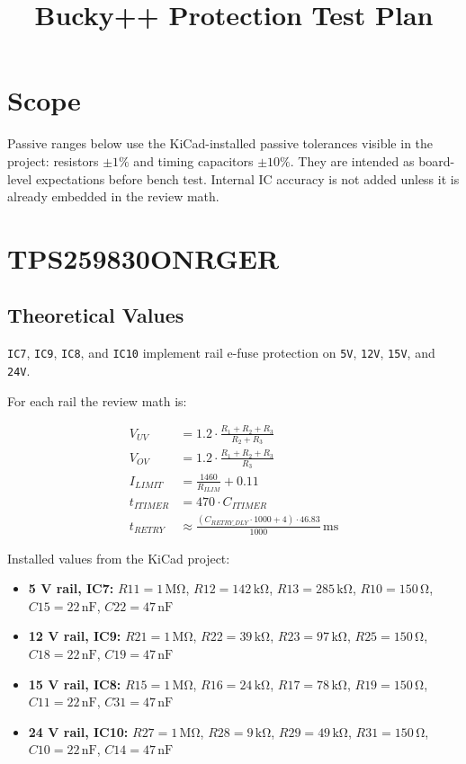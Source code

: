 \documentclass[11pt,a4paper]{article}
\begin{document}
\title{Bucky++ Protection Test Plan}
\date{}
\maketitle
\tableofcontents

\section*{Scope}

Passive ranges below use the KiCad-installed passive tolerances visible in the project: resistors $\pm 1\%$ and timing capacitors $\pm 10\%$. They are intended as board-level expectations before bench test. Internal IC accuracy is not added unless it is already embedded in the review math.

\section{TPS259830ONRGER}

\subsection{Theoretical Values}

\texttt{IC7}, \texttt{IC9}, \texttt{IC8}, and \texttt{IC10} implement rail e-fuse protection on \texttt{5V}, \texttt{12V}, \texttt{15V}, and \texttt{24V}.

For each rail the review math is:

\begin{align}
V_{UV} &= 1.2 \cdot \frac{R_1 + R_2 + R_3}{R_2 + R_3} \\
V_{OV} &= 1.2 \cdot \frac{R_1 + R_2 + R_3}{R_3} \\
I_{LIMIT} &= \frac{1460}{R_{ILIM}} + 0.11 \\
t_{ITIMER} &= 470 \cdot C_{ITIMER} \\
t_{RETRY} &\approx \frac{\left(C_{RETRY\_DLY} \cdot 1000 + 4\right) \cdot 46.83}{1000}\,\mathrm{ms}
\end{align}

Installed values from the KiCad project:

\begin{itemize}
\item \textbf{5 V rail, IC7:} $R11 = 1\,\mathrm{M\Omega}$, $R12 = 142\,\mathrm{k\Omega}$, $R13 = 285\,\mathrm{k\Omega}$, $R10 = 150\,\mathrm{\Omega}$, $C15 = 22\,\mathrm{nF}$, $C22 = 47\,\mathrm{nF}$
\item \textbf{12 V rail, IC9:} $R21 = 1\,\mathrm{M\Omega}$, $R22 = 39\,\mathrm{k\Omega}$, $R23 = 97\,\mathrm{k\Omega}$, $R25 = 150\,\mathrm{\Omega}$, $C18 = 22\,\mathrm{nF}$, $C19 = 47\,\mathrm{nF}$
\item \textbf{15 V rail, IC8:} $R15 = 1\,\mathrm{M\Omega}$, $R16 = 24\,\mathrm{k\Omega}$, $R17 = 78\,\mathrm{k\Omega}$, $R19 = 150\,\mathrm{\Omega}$, $C11 = 22\,\mathrm{nF}$, $C31 = 47\,\mathrm{nF}$
\item \textbf{24 V rail, IC10:} $R27 = 1\,\mathrm{M\Omega}$, $R28 = 9\,\mathrm{k\Omega}$, $R29 = 49\,\mathrm{k\Omega}$, $R31 = 150\,\mathrm{\Omega}$, $C10 = 22\,\mathrm{nF}$, $C14 = 47\,\mathrm{nF}$
\end{itemize}
\end{document}
